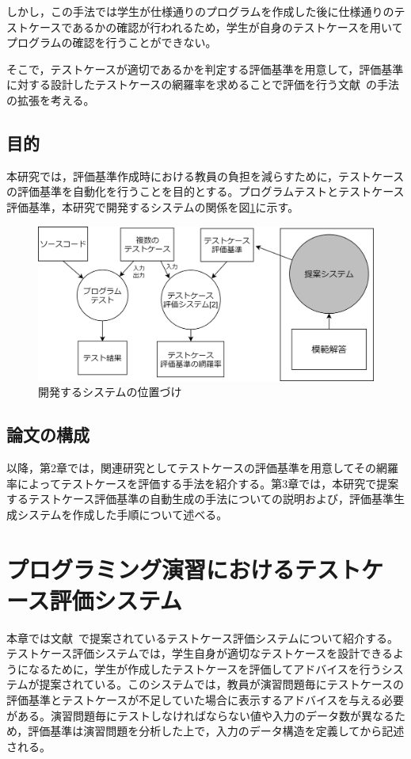 \documentclass{tpu-sotu}
\begin{document}
しかし，この手法では学生が仕様通りのプログラムを作成した後に仕様通りのテストケースであるかの確認が行われるため，学生が自身のテストケースを用いてプログラムの確認を行うことができない。

そこで，テストケースが適切であるかを判定する評価基準を用意して，評価基準に対する設計したテストケースの網羅率を求めることで評価を行う文献~\cite{a1}の手法の拡張を考える。
\section{目的}
本研究では，評価基準作成時における教員の負担を減らすために，テストケースの評価基準を自動化を行うことを目的とする。プログラムテストとテストケース評価基準，本研究で開発するシステムの関係を図\ref{a3}に示す。

\begin{figure}[h]
  \centering
  \includegraphics[width=130mm]{提案システムの位置づけ2.png}
  \caption{開発するシステムの位置づけ}
  \label{a3}
\end{figure}

\section{論文の構成}
以降，第2章では，関連研究としてテストケースの評価基準を用意してその網羅率によってテストケースを評価する手法を紹介する。第3章では，本研究で提案するテストケース評価基準の自動生成の手法についての説明および，評価基準生成システムを作成した手順について述べる。
\chapter{プログラミング演習におけるテストケース評価システム}
本章では文献~\cite{a1}で提案されているテストケース評価システムについて紹介する。テストケース評価システムでは，学生自身が適切なテストケースを設計できるようになるために，学生が作成したテストケースを評価してアドバイスを行うシステムが提案されている。このシステムでは，教員が演習問題毎にテストケースの評価基準とテストケースが不足していた場合に表示するアドバイスを与える必要がある。演習問題毎にテストしなければならない値や入力のデータ数が異なるため，評価基準は演習問題を分析した上で，入力のデータ構造を定義してから記述される。
\end{document}
